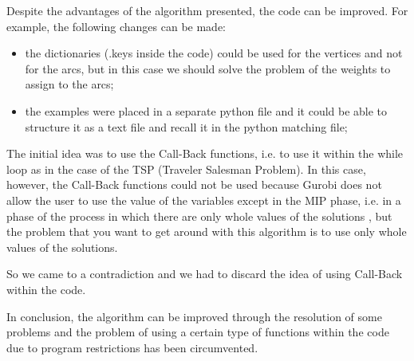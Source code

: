 Despite the advantages of the algorithm presented, the code can be improved. For example, the following changes can be made:
\begin{itemize}
\item the dictionaries (.keys inside the code) could be used for the vertices and not for the arcs, but in this case we should solve the problem of the weights to assign to the arcs;
\item the examples were placed in a separate python file and it could be able to structure it as a text file and recall it in the python matching file;
\end {itemize}

The initial idea was to use the Call-Back functions, i.e. to use it within the while loop as in the case of the TSP (Traveler Salesman Problem). In this case, however, the Call-Back functions could not be used because Gurobi does not allow the user to use the value of the variables except in the MIP phase, i.e. in a phase of the process in which there are only whole values of the solutions , but the problem that you want to get around with this algorithm is to use only whole values of the solutions.

So we came to a contradiction and we had to discard the idea of using Call-Back within the code.

In conclusion, the algorithm can be improved through the resolution of some problems and the problem of using a certain type of functions within the code due to program restrictions has been circumvented.